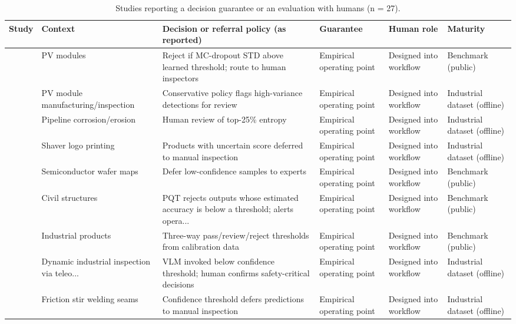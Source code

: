 \begin{table}[t]
\caption{Studies reporting a decision guarantee or an evaluation with humans (n = 27).}
\label{tab:decision}
\centering\scriptsize
\begin{tabularx}{\textwidth}{p{}p{}Yp{0.12\textwidth}p{0.12\textwidth}p{0.11\textwidth}}
\toprule
Study & Context & Decision or referral policy (as reported) & Guarantee & Human role & Maturity \\
\midrule
\cite{alqahtani2026robust} & PV modules & Reject if MC-dropout STD above learned threshold; route to human inspectors & Empirical operating point & Designed into workflow & Benchmark (public) \\
\cite{khandagale2026dasformer} & PV module manufacturing/inspection & Conservative policy flags high-variance detections for review & Empirical operating point & Designed into workflow & Industrial dataset (offline) \\
\cite{gohel2026interpretable} & Pipeline corrosion/erosion & Human review of top-25\% entropy & Empirical operating point & Designed into workflow & Industrial dataset (offline) \\
\cite{rozanec2023active} & Shaver logo printing & Products with uncertain score deferred to manual inspection & Empirical operating point & Designed into workflow & Industrial dataset (offline) \\
\cite{sahoo2026hybrid} & Semiconductor wafer maps & Defer low-confidence samples to experts & Empirical operating point & Designed into workflow & Benchmark (public) \\
\cite{thakur2024deep} & Civil structures & PQT rejects outputs whose estimated accuracy is below a threshold; alerts opera... & Empirical operating point & Designed into workflow & Benchmark (public) \\
\cite{kinalioglu2026risk} & Industrial products & Three-way pass/review/reject thresholds from calibration data & Empirical operating point & Designed into workflow & Benchmark (public) \\
\cite{lo2026semantic} & Dynamic industrial inspection via teleo... & VLM invoked below confidence threshold; human confirms safety-critical decisions & Empirical operating point & Designed into workflow & Industrial dataset (offline) \\
\cite{bauer2025handling} & Friction stir welding seams & Confidence threshold defers predictions to manual inspection & Empirical operating point & Designed into workflow & Industrial dataset (offline) \\

\end{tabularx}
\end{table}
